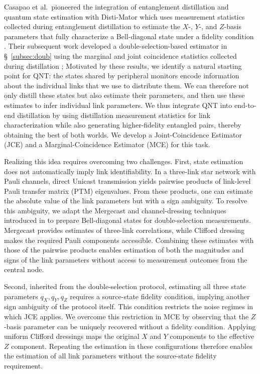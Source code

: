 Casapao et al.\ pioneered the integration of entanglement
distillation and quantum state estimation with
Disti-Mator which
uses measurement statistics collected during entanglement
distillation to estimate the $X$-, $Y$-, and $Z$-basis parameters
that fully characterize a Bell-diagonal state under a fidelity
condition \cite{Casapao2025DistiMator}.
Their subsequent work developed a double-selection-based
estimator in \S~\ref{subsec:doub} using the marginal and joint coincidence statistics
collected during distillation \cite{Casapao_2025};
Motivated by these results, we identify a natural starting
point for QNT: the states shared by peripheral monitors
encode information about the individual links that we
use to distribute them.
We can therefore not only distill these states but also
estimate their parameters, and then use these estimates
to infer individual link parameters.
We thus integrate QNT into end-to-end distillation by using
distillation measurement statistics for link characterization
while also generating higher-fidelity entangled pairs,
thereby obtaining the best of both worlds.
We develop a Joint-Coincidence Estimator (JCE) and a
Marginal-Coincidence Estimator (MCE) for this task.




Realizing this idea requires overcoming two challenges. First,
state estimation does not automatically imply link identifiability.
In a three-link star network with Pauli channels, direct Unicast
transmission yields pairwise products of link-level Pauli transfer
matrix (PTM) eigenvalues. From these products, one can estimate the absolute value of the link parameters but with a sign ambiguity. To resolve this ambiguity, we adapt the Mergecast
and channel-dressing techniques introduced
in \cite{wang2025quantumnetworktomographygeneral} to prepare
Bell-diagonal states for double-selection measurements.
Mergecast provides estimates of three-link correlations,
while Clifford dressing makes the required Pauli components
accessible. Combining these estimates with those of the pairwise
products enables estimation of both the magnitudes and
signs of the link parameters without access to measurement
outcomes from the central node.

Second, inherited from the double-selection protocol, estimating all three state parameters \(q_X, q_Y, q_Z\) requires a source-state fidelity condition, implying another sign ambiguity of the protocol itself.
 This condition restricts
the noise regimes in which JCE applies. We overcome this
restriction in MCE  by observing that
the $Z$-basis parameter can be uniquely recovered without
a fidelity condition. Applying uniform Clifford dressings
maps the original $X$ and $Y$ components to the effective
$Z$ component. Repeating the estimation in these configurations
therefore enables the estimation of all link parameters
without the source-state fidelity requirement.

